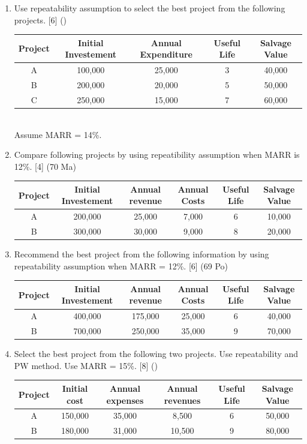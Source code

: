 \documentclass[12pt]{article}
\begin{document}
\begin{enumerate}
				\item Use repeatability assumption to select the best project from the following projects. \hfill [6] ()
				\begin{tabular}{|c|c|c|c|c|}
					\hline
					Project & Initial Investement & Annual Expenditure & Useful Life & Salvage Value \\ \hline
					A & 100,000 & 25,000 & 3 & 40,000 \\ \hline
					B & 200,000 & 20,000 & 5 & 50,000 \\ \hline
					C & 250,000 & 15,000 & 7 & 60,000 \\ \hline
				\end{tabular}\\
				Assume MARR = 14\%.
				
				\item Compare following projects by using  repeatibility assumption when MARR is 12\%. \hfill [4] (70 Ma)\\
				\begin{tabular}{|c|c|c|c|c|c|}
					\hline
					Project & Initial Investement & Annual revenue & Annual Costs & Useful Life & Salvage Value \\ \hline
					A & 200,000 & 25,000 & 7,000 & 6 & 10,000 \\ \hline
					B & 300,000 & 30,000 & 9,000 & 8 & 20,000 \\ \hline
				\end{tabular}
				
				\item Recommend the best project from the following information by using repeatability assumption when MARR = 12\%. \hfill [6] (69 Po)\\
				\begin{tabular}{|c|c|c|c|c|c|}
					\hline
					Project & Initial Investement & Annual revenue & Annual Costs & Useful Life & Salvage Value \\ \hline
					A & 400,000 & 175,000 & 25,000 & 6 & 40,000 \\ \hline
					B & 700,000 & 250,000 & 35,000 & 9 & 70,000 \\ \hline
				\end{tabular}
				
				\item Select the best project from the following two projects. Use repeatability and PW method. Use MARR = 15\%. \hfill [8] () \\
				\begin{tabular}{|c|c|c|c|c|c|}
					\hline
					Project & Initial cost & Annual expenses & Annual revenues & Useful Life & Salvage Value \\ \hline
					A & 150,000 & 35,000 & 8,500 & 6 & 50,000 \\ \hline
					B & 180,000 & 31,000 & 10,500 & 9 & 80,000 \\ \hline
				\end{tabular}
			\end{enumerate}
	
\end{document}

